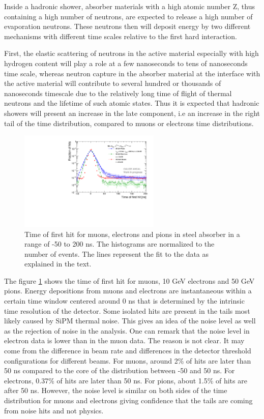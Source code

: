 Inside a hadronic shower, absorber materials with a high atomic number Z, thus containing a high number of neutrons, are expected to release a high number of evaporation neutrons. These neutrons then will deposit energy by two different mechanisms with different time scales relative to the first hard interaction.

First, the elastic scattering of neutrons in the active material especially with high hydrogen content will play a role at a few nanoseconds to tens of nanoseconds time scale, whereas neutron capture in the absorber material at the interface with the active material will contribute to several hundred or thousands of nanoseconds timescale due to the relatively long time of flight of thermal neutrons and the lifetime of such atomic states. Thus it is expected that hadronic showers will present an increase in the late component, i.e an increase in the right tail of the time distribution, compared to muons or electrons time distributions.

\begin{figure}[htbp!]
	\centering
	\includegraphics[width=0.6\textwidth]{../Thesis_Plots/Timing/Pions/Plots/Timing_dNdt_Comparison.pdf}
	\caption{Time of first hit for muons, electrons and pions in steel absorber in a range of -50 to 200 ns. The histograms are normalized to the number of events. The lines represent the fit to the data as explained in the text.}
	\label{fig:dNdt_Comparison}
\end{figure}

The figure \ref{fig:dNdt_Comparison} shows the time of first hit for muons, 10 GeV electrons and 50 GeV pions. Energy depositions from muons and electrons are instantaneous within a certain time window centered around 0 ns that is determined by the intrinsic time resolution of the detector. Some isolated hits are present in the tails most likely caused by SiPM thermal noise. This gives an idea of the noise level as well as the rejection of noise in the analysis. One can remark that the noise level in electron data is lower than in the muon data. The reason is not clear. It may come from the difference in beam rate and differences in the detector threshold configurations for different beams. For muons, around 2\% of hits are later than 50 ns compared to the core of the distribution between -50 and 50 ns. For electrons, 0.37\% of hits are later than 50 ns. For pions, about 1.5\% of hits are after 50 ns. However, the noise level is similar on both sides of the time distribution for muons and electrons giving confidence that the tails are coming from noise hits and not physics.

